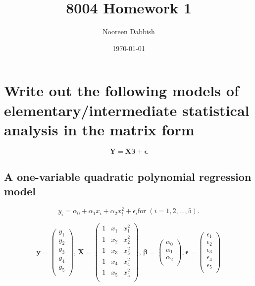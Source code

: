 \documentclass[11pt]{article}
\title{8004 Homework 1}
\author{Nooreen Dabbish}
\date{\today}
\begin{document}
\maketitle



\section{Write out the following models of elementary/intermediate statistical analysis in the matrix form}
\label{sec-1}

\[ \mathbf{Y} = \mathbf{X\beta} +\mathbf{\epsilon} \]
\subsection{A one-variable quadratic polynomial regression model}
\label{sec-1-1}

\[
y_i = \alpha_0 + \alpha_1x_i + \alpha_2 x_i^2 + \epsilon_i \textrm{
for }   (i = 1,2,\ldots,5).
\]




\[
\mathbf{y} = 
\begin{pmatrix}{}
  y_1 \\ 
  y_2 \\ 
  y_3 \\ 
  y_4 \\ 
  y_5 \\ 
  \end{pmatrix},\,
\mathbf{X} = 
\begin{pmatrix}{}
  1 & x_1 & x^2_1 \\ 
  1 & x_2 & x^2_2 \\ 
  1 & x_3 & x^2_3 \\ 
  1 & x_4 & x^2_4 \\ 
  1 & x_5 & x^2_5 \\ 
  \end{pmatrix},\,
\mathbf{\beta} = 
\begin{pmatrix}{} 
  \alpha_0 \\ 
  \alpha_1 \\ 
  \alpha_2 \\
  \end{pmatrix}, 
\mathbf{\epsilon} =
\begin{pmatrix}{}
  \epsilon_1 \\ 
  \epsilon_2 \\ 
  \epsilon_3 \\ 
  \epsilon_4 \\ 
  \epsilon_5 \\ 
  \end{pmatrix}
\]
\end{document}
